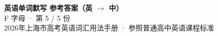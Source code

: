 \documentclass[10pt,a4paper]{article}
\begin{document}
\pagestyle{plain}

\begin{center}
{\LARGE\bfseries 英语单词默写 \quad 参考答案（英 $\to$ 中）}\\[0.22em]
{\large F 字母 · 第 5 / 5 份}\\[0.18em]
{\small 2026年上海市高考英语词汇用法手册 · 参照普通高中英语课程标准}
\end{center}

\vspace{0.2em}
\noindent{\color{rulegray}\rule{\textwidth}{0.8pt}}

\vspace{0.35em}

\vspace{0.25em}
\renewcommand{\arraystretch}{1.32}
\end{document}
